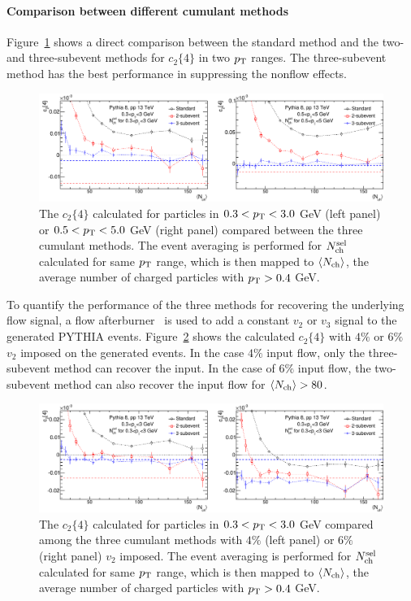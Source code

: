 \paragraph{Comparison between different cumulant methods}

Figure~\ref{fig:subcumu_PYTHIA_c24} shows a direct comparison between the standard method and the two- and three-subevent methods for $c_2\{4\}$ in two $p_\text{T}$ ranges. The three-subevent method has the best performance in suppressing the nonflow effects.

\begin{figure}[H]
\centering
\includegraphics[width=.95\linewidth]{figs/chapter_subcumu/PYTHIA_c24}
\caption{The $c_2\{4\}$ calculated for particles in $0.3<p_\text{T}<3.0$ GeV (left panel) or $0.5<p_\text{T}<5.0$ GeV (right panel) compared between the three cumulant methods. The event averaging is performed for $N_\text{ch}^\text{sel}$ calculated for same $p_\text{T}$ range, which is then mapped to $\left\langle N_\text{ch}\right\rangle$, the average number of charged particles with $p_\text{T}>0.4$ GeV.}
\label{fig:subcumu_PYTHIA_c24}
\end{figure}

To quantify the performance of the three methods for recovering the underlying flow signal, a flow afterburner~\cite{Masera:2009zz} is used to add a constant $v_2$ or $v_3$ signal to the generated PYTHIA events. Figure~\ref{fig:subcumu_PYTHIA_c24_ab} shows the calculated $c_2\{4\}$ with $4\%$ or $6\%$ $v_2$ imposed on the generated events. In the case $4\%$ input flow, only the three-subevent method can recover the input. In the case of $6\%$ input flow, the two-subevent method can also recover the input flow for $\left\langle N_\text{ch}\right\rangle>80$.

\begin{figure}[H]
\centering
\includegraphics[width=.95\linewidth]{figs/chapter_subcumu/PYTHIA_c24_ab}
\caption{The $c_2\{4\}$ calculated for particles in $0.3<p_\text{T}<3.0$ GeV compared among the three cumulant methods with $4\%$ (left panel) or $6\%$ (right panel) $v_2$ imposed. The event averaging is performed for $N_\text{ch}^\text{sel}$ calculated for same $p_\text{T}$ range, which is then mapped to $\left\langle N_\text{ch}\right\rangle$, the average number of charged particles with $p_\text{T}>0.4$ GeV.}
\label{fig:subcumu_PYTHIA_c24_ab}
\end{figure}



